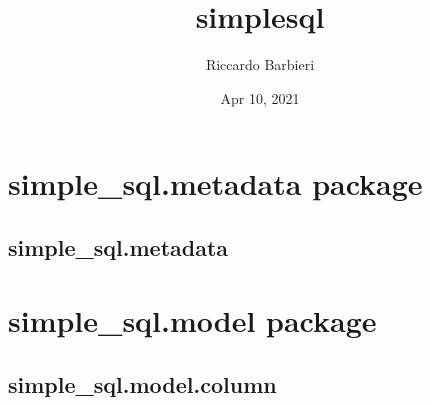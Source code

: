 \documentclass[letterpaper,10pt,english]{sphinxmanual}
\title{simple\sphinxhyphen{}sql}
\date{Apr 10, 2021}
\author{Riccardo Barbieri}
\begin{document}
\pagestyle{empty}
\sphinxmaketitle
\pagestyle{plain}
\sphinxtableofcontents
\pagestyle{normal}
\label{\detokenize{index::doc}}



\chapter{simple\_sql.metadata package}
\label{\detokenize{metadata:simple-sql-metadata-package}}\label{\detokenize{metadata::doc}}

\section{simple\_sql.metadata}
\label{\detokenize{metadata:simple-sql-metadata}}

\begin{fulllineitems}
\label{\detokenize{metadata:simple_sql.metadata.MetaData}}
\end{fulllineitems}



\chapter{simple\_sql.model package}
\label{\detokenize{model:simple-sql-model-package}}\label{\detokenize{model::doc}}

\section{simple\_sql.model.column}
\label{\detokenize{model:simple-sql-model-column}}
\end{document}
